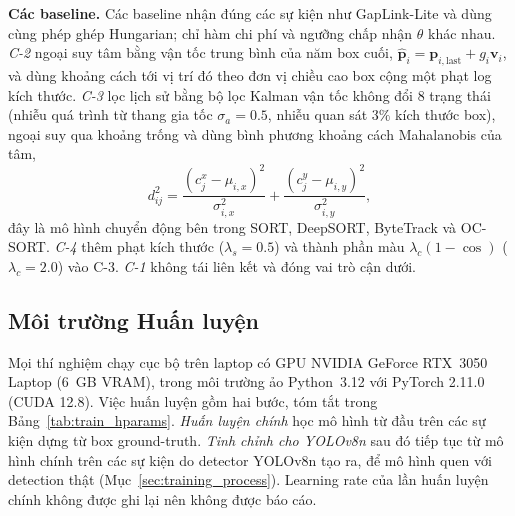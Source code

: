 \textbf{Các baseline.} Các baseline nhận đúng các sự kiện như GapLink-Lite và dùng cùng phép ghép Hungarian; chỉ hàm chi phí và ngưỡng chấp nhận $\theta$ khác nhau. \emph{C-2} ngoại suy tâm bằng vận tốc trung bình của năm box cuối, $\hat{\mathbf{p}}_i = \mathbf{p}_{i,\text{last}} + g_i \mathbf{v}_i$, và dùng khoảng cách tới vị trí đó theo đơn vị chiều cao box cộng một phạt log kích thước. \emph{C-3} lọc lịch sử bằng bộ lọc Kalman vận tốc không đổi 8 trạng thái (nhiễu quá trình từ thang gia tốc $\sigma_a = 0.5$, nhiễu quan sát $3\%$ kích thước box), ngoại suy qua khoảng trống và dùng bình phương khoảng cách Mahalanobis của tâm,
\begin{equation}
    d^2_{ij} = \frac{(c^x_j - \mu_{i,x})^2}{\sigma^2_{i,x}} + \frac{(c^y_j - \mu_{i,y})^2}{\sigma^2_{i,y}},
\end{equation}
đây là mô hình chuyển động bên trong SORT, DeepSORT, ByteTrack và OC-SORT. \emph{C-4} thêm phạt kích thước ($\lambda_s = 0.5$) và thành phần màu $\lambda_c(1-\cos)$ ($\lambda_c = 2.0$) vào C-3. \emph{C-1} không tái liên kết và đóng vai trò cận dưới.

\subsection{Môi trường Huấn luyện}
\label{sec:training_env}

Mọi thí nghiệm chạy cục bộ trên laptop có GPU NVIDIA GeForce RTX~3050 Laptop (6~GB VRAM), trong môi trường ảo Python~3.12 với PyTorch 2.11.0 (CUDA 12.8). Việc huấn luyện gồm hai bước, tóm tắt trong Bảng~\ref{tab:train_hparams}. \emph{Huấn luyện chính} học mô hình từ đầu trên các sự kiện dựng từ box ground-truth. \emph{Tinh chỉnh cho YOLOv8n} sau đó tiếp tục từ mô hình chính trên các sự kiện do detector YOLOv8n tạo ra, để mô hình quen với detection thật (Mục~\ref{sec:training_process}). Learning rate của lần huấn luyện chính không được ghi lại nên không được báo cáo.

